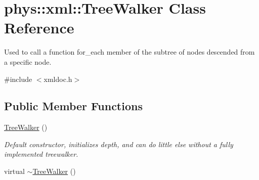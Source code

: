 \hypertarget{classphys_1_1xml_1_1TreeWalker}{
\section{phys::xml::TreeWalker Class Reference}
\label{d5/d8d/classphys_1_1xml_1_1TreeWalker}
}


Used to call a function for\_\-each member of the subtree of nodes descended from a specific node.  




{\ttfamily \#include $<$xmldoc.h$>$}

\subsection*{Public Member Functions}
\begin{DoxyCompactItemize}
\item 
\hypertarget{classphys_1_1xml_1_1TreeWalker_a5b4e97d7a0b433770431f8ebd8fc6489}{
\hyperlink{classphys_1_1xml_1_1TreeWalker_a5b4e97d7a0b433770431f8ebd8fc6489}{TreeWalker} ()}
\label{d5/d8d/classphys_1_1xml_1_1TreeWalker_a5b4e97d7a0b433770431f8ebd8fc6489}

\begin{DoxyCompactList}\small\item\em Default constructor, initializes depth, and can do little else without a fully implemented treewalker. \item\end{DoxyCompactList}\item 
\hypertarget{classphys_1_1xml_1_1TreeWalker_a84d0c68cf364a81e29f0cc321098ae28}{
virtual \hyperlink{classphys_1_1xml_1_1TreeWalker_a84d0c68cf364a81e29f0cc321098ae28}{$\sim$TreeWalker} ()}
\label{d5/d8d/classphys_1_1xml_1_1TreeWalker_a84d0c68cf364a81e29f0cc321098ae28}


\end{DoxyCompactItemize}
